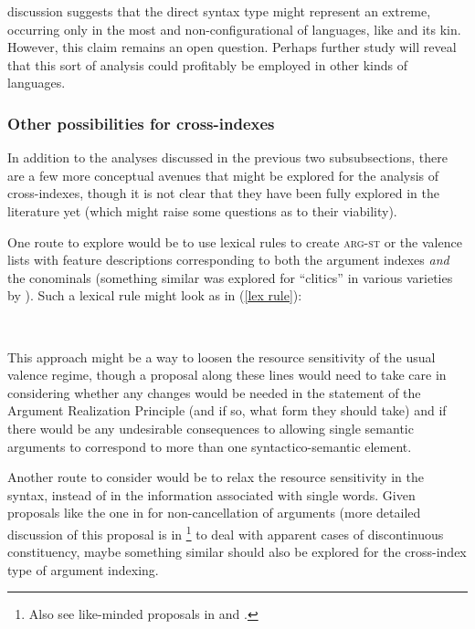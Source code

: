 \documentclass[output=paper
 	        ,biblatex
                ,babelshorthands
                ,newtxmath
                ,draftmode
                ,colorlinks, citecolor=brown
]{langscibook}
\begin{document}
 discussion suggests that the direct syntax type might represent an extreme, occurring only in the most  and non-configurational of languages, like  and its  kin. However, this claim remains an open question. Perhaps further study will reveal that this sort of analysis could profitably be employed in other kinds of languages.  

\subsubsection{Other possibilities for cross-indexes} \label{other poss for cross}

In addition to the analyses discussed in the previous two subsubsections, there are a few more conceptual avenues that might be explored for the analysis of cross-indexes, though it is not clear that they have been fully explored in the literature yet (which might raise some questions as to their viability). 

One route to explore would be to use lexical rules to create \textsc{arg-st} or the valence lists with feature descriptions corresponding to both the argument indexes \emph{and} the conominals (something similar was explored for ``clitics'' in various  varieties by \citealt{monachesi05}). Such a lexical rule might look as in (\ref{lex rule}):
%
\begin{exe}
\ex \label{lex rule}
 \\								 
\flushright	
{}
\end{exe}

\noindent
This approach might be a way to loosen the resource sensitivity of the usual valence regime, though a proposal along these lines would need to take care in considering whether any changes would be needed in the statement of the Argument Realization Principle (and if so, what form they should take) and if there would be any undesirable consequences to allowing single semantic arguments to correspond to more than one syntactico-semantic element.    

Another route to consider would be to relax the resource sensitivity in the syntax, instead of in the information associated with single words. Given proposals like the one in \citet{Bender2008a} for non-cancellation of arguments (more detailed discussion of this proposal is in \footnote{Also see like-minded proposals in \citet{Meurers99b} and \citet{Mueller2008a}.} to deal with apparent cases of discontinuous constituency, maybe something similar should also be explored for the cross-index type of argument indexing. 
\end{document}
